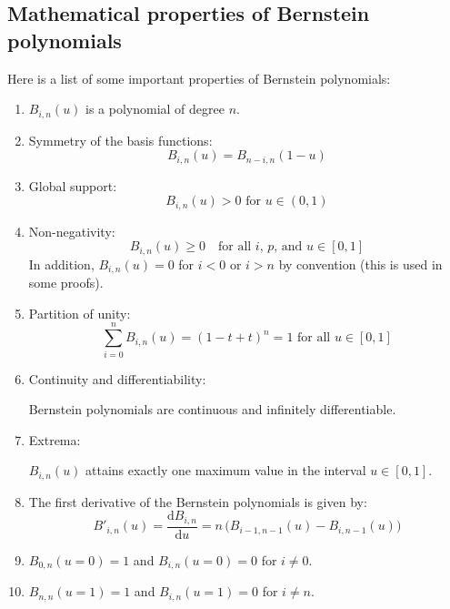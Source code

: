 \subsection{Mathematical properties of Bernstein polynomials}
Here is a list of some important properties of Bernstein polynomials:
\begin{enumerate}

    \item $B_{i,n}(u)$ is a polynomial of degree $n$.

    \item Symmetry of the basis functions:
    \begin{equation*}
        B_{i,n}(u) = B_{n-i,n}(1-u)
    \end{equation*}
    
    \item Global support:
    \begin{equation*}
        B_{i,n}(u)>0 \text{ for } u \in (0,1)
    \end{equation*}
    
    \item Non-negativity:
        \begin{equation*}
            B_{i,n}(u) \geq 0 \quad \text{for all $i$, $p$, and $u \in [0, 1]$}
        \end{equation*}
        In addition, $B_{i,n}(u) = 0$ for $i<0$ or $i>n$ by convention (this is used in some proofs).
        
    \item Partition of unity:
        \begin{equation*}
            \sum_{i=0}^{n} B_{i,n}(u)  = (1-t+t)^{n} = 1 \text{ for all } u \in [0, 1]
        \end{equation*}
    
    \item Continuity and differentiability:
    
    Bernstein polynomials are continuous and infinitely differentiable.
    
    \item Extrema:
    
    $B_{i,n}(u)$ attains exactly one maximum value in the interval $u \in [0, 1]$.
    
    \item The first derivative of the Bernstein polynomials is given by:
    \begin{equation*}
        B'_{i,n}(u) = \frac{\mathrm{d}B_{i,n}}{\mathrm{d}u} = n\, \big(B_{i-1,n-1}(u) - B_{i,n-1}(u)\big)
    \end{equation*}

    \item $B_{0,n}(u=0) =1$ and $B_{i,n}(u=0)=0$ for $i\neq0$.
    
    \item $B_{n,n}(u=1) =1$ and $B_{i,n}(u=1)=0$ for $i\neq n$.
    
\end{enumerate}



